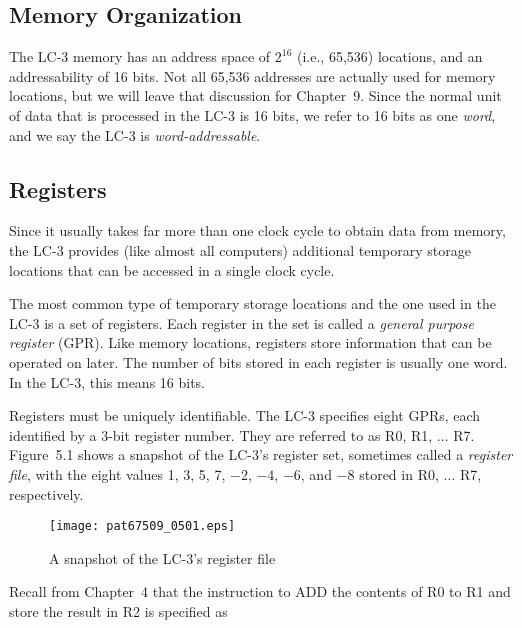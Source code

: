 \documentclass{patt}
\begin{document}
\subsection{Memory Organization}

The LC-3 memory has an address space of $2^{16}$ (i.e.,
65,536) locations, and an addressability of 16 bits. Not all
65,536 addresses are actually used for memory locations, but
we will leave that discussion for Chapter~9.
Since the normal unit of data that is processed in the LC-3 is 16
bits, we refer to 16 bits as one {\em word}, and we say the
LC-3 is {\em word-addressable}.

\subsection{Registers}

Since it usually takes far more than one clock cycle
to obtain data from memory, the LC-3 provides (like almost all
computers) additional temporary storage locations that can be
accessed in a single clock cycle.

The most common type of temporary storage locations and the one used in the 
LC-3 is a set of registers.  Each register in the set is called 
a {\em general purpose register} (GPR).  Like memory locations, registers 
store information that can be operated on later.  The number of bits stored in 
each register is usually one word.  In the LC-3, this means 16 bits.

Registers must be uniquely identifiable. The LC-3 specifies eight
GPRs, each identified by a 3-bit register number. They are referred
to as R0, R1, $\ldots$ R7. Figure~5.1 shows a snapshot of the LC-3's
register set, sometimes called a {\em register file}, with the eight
values 1, 3, 5, 7, $-2$, $-4$, $-6$, and $-8$ stored in R0, $\ldots$ R7, respectively.

\begin{figure}[b]
\centerline{\texttt{[image: pat67509\_0501.eps]}}
\vspace{-1pt}
\caption{A snapshot of the LC-3's register file}
\end{figure}

Recall from Chapter~4 that the instruction to ADD the contents of R0 to R1
and store the result in R2 is specified as
\end{document}
